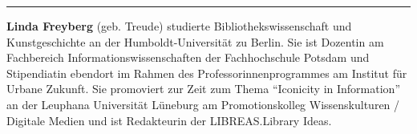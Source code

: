 \begin{center}\rule{0.5\linewidth}{\linethickness}\end{center}

\textbf{Linda Freyberg} (geb. Treude) studierte Bibliothekswissenschaft
und Kunstgeschichte an der Humboldt-Universität zu Berlin. Sie ist
Dozentin am Fachbereich Informationswissenschaften der Fachhochschule
Potsdam und Stipendiatin ebendort im Rahmen des Professorinnenprogrammes
am Institut für Urbane Zukunft. Sie promoviert zur Zeit zum Thema
``Iconicity in Information'' an der Leuphana Universität Lüneburg am
Promotionskolleg Wissenskulturen / Digitale Medien und ist Redakteurin
der LIBREAS.Library Ideas.
